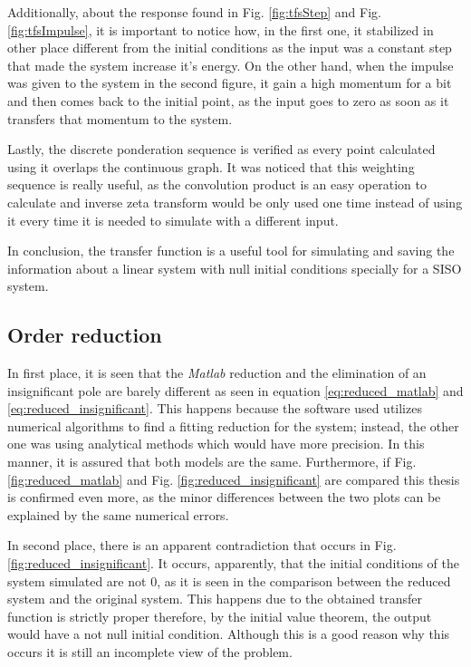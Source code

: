 Additionally, about the response found in Fig. \ref{fig:tfsStep} and Fig. \ref{fig:tfsImpulse}, it is important to notice how, in the first one, it stabilized in other place different from the initial conditions as the input was a constant step that made the system increase it's energy. On the other hand, when the impulse was given to the system in the second figure, it gain a high momentum for a bit and then comes back to the initial point, as the input goes to zero as soon as it transfers that momentum to the system.

Lastly, the discrete ponderation sequence is verified as every point calculated using it overlaps the continuous graph. It was noticed that this weighting sequence is really useful, as the convolution product is an easy operation to calculate and inverse zeta transform would be only used one time instead of using it every time it is needed to simulate with a different input.

In conclusion, the transfer function is a useful tool for simulating and saving the information about a linear system with null initial conditions specially for a SISO system.

\subsection{Order reduction}
In first place, it is seen that the \textit{Matlab} reduction and the elimination of an insignificant pole are barely different as seen in equation \ref{eq:reduced_matlab} and \ref{eq:reduced_insignificant}. This happens because the software used utilizes numerical algorithms to find a fitting reduction for the system; instead, the other one was using analytical methods which would have more precision. In this manner, it is assured that both models are the same. Furthermore, if Fig. \ref{fig:reduced_matlab} and Fig. \ref{fig:reduced_insignificant} are compared this thesis is confirmed even more, as the minor differences between the two plots can be explained by the same numerical errors.

In second place, there is an apparent contradiction that occurs in Fig. \ref{fig:reduced_insignificant}. It occurs, apparently, that the initial conditions of the system simulated are not 0, as it is seen in the comparison between the reduced system and the original system. This happens due to the obtained transfer function is strictly proper therefore, by the initial value theorem, the output would have a not null initial condition. Although this is a good reason why this occurs it is still an incomplete view of the problem.


